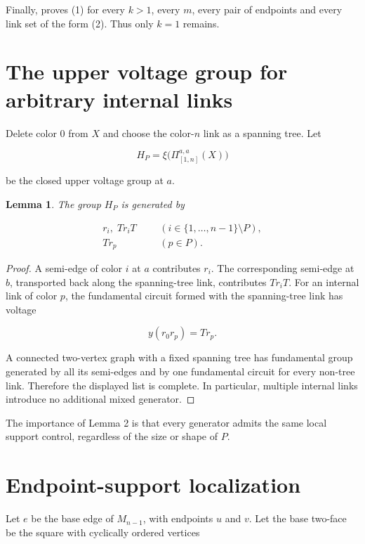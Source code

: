 \documentclass[11pt]{article}
\newtheorem{lemma}[theorem]{Lemma}
\begin{document}
Finally, \cite[Theorem 6.4]{mochan2024} proves (1) for every $k>1$, every $m$, every pair of endpoints and every
link set of the form (2). Thus only $k=1$ remains.


\section{The upper voltage group for arbitrary internal links}

Delete color $0$ from $X$ and choose the color-$n$ link as a spanning tree. Let

\[
H_P=\xi\bigl(\Pi_{[1,n]}^{a,a}(X)\bigr)
\]

be the closed upper voltage group at $a$.

\begin{lemma}

The group $H_P$ is generated by

\[
\begin{aligned}
r_i,\;Tr_iT &&& (i\in\{1,\ldots,n-1\}\setminus P),\\
Tr_p &&& (p\in P).
\end{aligned}
\tag{6}
\]

\end{lemma}

\begin{proof}

A semi-edge of color $i$ at $a$ contributes $r_i$. The corresponding semi-edge at $b$, transported
back along the spanning-tree link, contributes $Tr_iT$. For an internal link of color $p$, the
fundamental circuit formed with the spanning-tree link has voltage

\[
y(r_0r_p)=Tr_p.
\]

A connected two-vertex graph with a fixed spanning tree has fundamental group generated by all its
semi-edges and by one fundamental circuit for every non-tree link. Therefore the displayed list is
complete. In particular, multiple internal links introduce no additional mixed generator.
\end{proof}

The importance of Lemma 2 is that every generator admits the same local support control, regardless
of the size or shape of $P$.


\section{Endpoint-support localization}

Let $e$ be the base edge of $M_{n-1}$, with endpoints $u$ and $v$. Let the base two-face be the
square with cyclically ordered vertices
\end{document}
